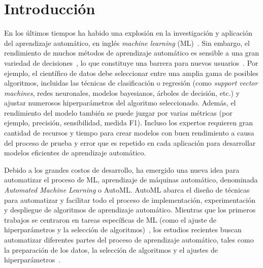 \chapter*{Introducción}\label{chapter:introduction}

\qquad 

En los últimos tiempos ha habido una explosión en la investigación y aplicación del aprendizaje automático, en inglés \textit{machine learning} (ML)~\cite{hey2020machinelearning}. Sin embargo, el rendimiento de muchos métodos de aprendizaje automático es sensible a una gran variedad de decisiones~\cite{dyrmishi2019decision, radwa2019automated}, lo que constituye una barrera para nuevos usuarios~\cite{crisan2021fits}. Por ejemplo, el científico de datos debe seleccionar entre una amplia gama de posibles algoritmos, incluidas las técnicas de clasificación o regresión (como \textit{support vector machines}, redes neuronales, modelos bayesianos, árboles de decisión, etc.) y ajustar numerosos hiperparámetros del algoritmo seleccionado. Además, el rendimiento del modelo también se puede juzgar por varias métricas (por ejemplo, precisión, sensibilidad, medida F1). Incluso los expertos requieren gran cantidad de recursos y tiempo para crear modelos con buen rendimiento a causa del proceso de prueba y error que es repetido en cada aplicación para desarrollar modelos eficientes de aprendizaje automático.

Debido a los grandes costos de desarrollo, ha emergido una nueva idea para automatizar el proceso de ML, aprendizaje de máquinas automático, denominada \textit{Automated Machine Learning} o AutoML. AutoML abarca el diseño de técnicas para automatizar y facilitar todo el proceso de implementación, experimentación y despliegue de algoritmos de aprendizaje automático. Mientras que los primeros trabajos se centraron en tareas específicas de ML (como el ajuste de hiperparámetros y la selección de algoritmos)~\cite{thornton2013auto}, los estudios recientes buscan automatizar diferentes partes del proceso de aprendizaje automático, tales como la preparación de los datos, la selección de algoritmos y el ajustes de hiperparámetros~\cite{fuerer2015efficient, olson2019tpot, paszke2019pytorch, chen2018autostacker, swearingen2017atm}.

